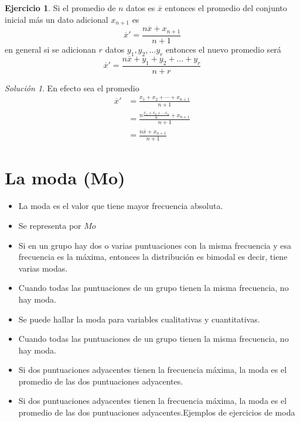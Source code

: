\documentclass[10pt,]{krantz}
\theoremstyle{definition}
\theoremstyle{definition}
\theoremstyle{definition}
\newtheorem{exercise}{Ejercicio}[chapter]
\theoremstyle{definition}
\theoremstyle{remark}
\newtheorem*{solution}{Solución}
\begin{document}
\begin{exercise}
\protect\hypertarget{exr:unnamed-chunk-10}{}{\label{exr:unnamed-chunk-10} }Si el promedio de \(n\) datos es \(\overline{x}\) entonces el promedio del conjunto inicial más un dato adicional \(x_{n+1}\) es \[\overline{x}'=\frac{n\overline{x}+x_{n+1}}{n+1}\] en general si se adicionan \(r\) datos \(y_1, y_2, \ldots y_r\) entonces el nuevo promedio será \[\overline{x}'=\frac{n\overline{x}+y_{1}+y_2+\ldots+y_r}{n+r}\]
\end{exercise}

\begin{solution}
{}En efecto sea el promedio
\begin{align*}
\overline{x}'&=\frac{x_1+x_2+\cdots+x_{n+1}}{n+1}\\
&=\frac{n\frac{x_1+x_2+\cdots x_n}{n}+x_{n+1}}{n+1}\\
&=\frac{n\overline{x}+x_{n+1}}{n+1}
\end{align*}
\end{solution}

\hypertarget{la-moda-mo}{%
\section{La moda (Mo)}\label{la-moda-mo}}

\begin{itemize}
\item
  La moda es el valor que tiene mayor frecuencia absoluta.
\item
  Se representa por \(Mo\)
\item
  Si en un grupo hay dos o varias puntuaciones con la misma frecuencia y esa frecuencia es la máxima, entonces la distribución es bimodal es decir, tiene varias modas.
\item
  Cuando todas las puntuaciones de un grupo tienen la misma frecuencia, no hay moda.
\item
  Se puede hallar la moda para variables cualitativas y cuantitativas.
\item
  Cuando todas las puntuaciones de un grupo tienen la misma frecuencia, no hay moda.
\item
  Si dos puntuaciones adyacentes tienen la frecuencia máxima, la moda es el promedio de las dos puntuaciones adyacentes.
\item
  Si dos puntuaciones adyacentes tienen la frecuencia máxima, la moda es el promedio de las dos puntuaciones adyacentes.Ejemplos de ejercicios de moda
\end{itemize}
\end{document}
